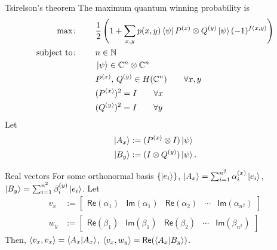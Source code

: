 \documentclass{beamer}
\begin{document}
\begin{frame}{Tsirelson's theorem}
\small
The maximum quantum winning probability is
\begin{align*}
\max\colon\qquad& \frac12\left(1 + \sum_{x,y}p(x,y) \bra{\psi}P^{(x)}\otimes Q^{(y)}\ket{\psi}(-1)^{f(x,y)}\right)\\
\text{subject to}\colon\qquad&
n\in\mathbb{N}\\
&\ket{\psi} \in \mathbb{C}^n\otimes\mathbb{C}^n\\
&P^{(x)},\, Q^{(y)} \in H(\mathbb{C}^n)\qquad  \forall x,y\\
&(P^{(x)})^2=I\qquad \forall x\\
&(Q^{(y)})^2=I\qquad \forall y\\
\end{align*}
Let 
\begin{align*}
\ket{A_x}&:=(P^{(x)}\otimes I)\ket{\psi}\\
\ket{B_y}&:=(I\otimes Q^{(y)})\ket{\psi}.
\end{align*}
\end{frame}

\begin{frame}{Real vectors}
For some orthonormal basis $\{\ket{e_i}\}$,
$\ket{A_x}=\sum_{i=1}^{n^2} \alpha_i^{(x)}\ket{e_i}$,
$\ket{B_y}=\sum_{i=1}^{n^2} \beta_i^{(y)}\ket{e_i}$.
Let
\begin{align*}
v_x &:= \begin{bmatrix}\mathsf{Re}(\alpha_1)& \mathsf{Im}(\alpha_1) &\mathsf{Re}(\alpha_2)&\dotsm&\mathsf{Im}(\alpha_{n^2})\end{bmatrix}\\
w_y &:= \begin{bmatrix}\mathsf{Re}(\beta_1)& \mathsf{Im}(\beta_1) &\mathsf{Re}(\beta_2)&\dotsm&\mathsf{Im}(\beta_{n^2})\end{bmatrix}
\end{align*}
Then, $\langle v_x, v_x\rangle = \braket{A_x|A_x}$, $\langle v_x, w_y\rangle = \mathsf{Re}(\braket{A_x|B_y})$.
\end{frame}
\end{document}
